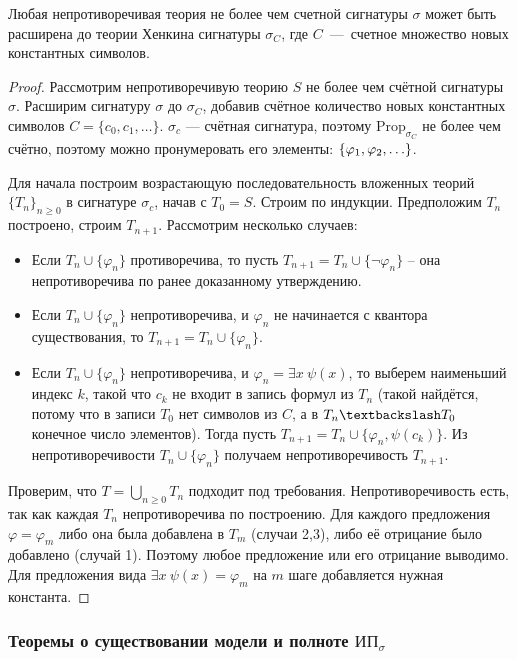 \begin{prop}
	Любая непротиворечивая теория не более чем счетной сигнатуры $\sigma$ может быть расширена до теории Хенкина сигнатуры $\sigma_C$, где  $C$~— счетное множество новых константных символов. 
\end{prop}
\begin{proof}
Рассмотрим непротиворечивую теорию $S$ не более чем счётной сигнатуры $\sigma$. Расширим сигнатуру $\sigma$ до $\sigma_C$, добавив счётное количество новых константных символов $C = \{c_0, c_1, \ldots\}$.
$\sigma_c$ — счётная сигнатура, поэтому $\text{Prop}_{\sigma_C}$ не более чем счётно, поэтому можно пронумеровать его элементы: $\set*{\vfi_1, \vfi_2, \dots}$.

Для начала построим возрастающую последовательность вложенных теорий $\{T_n\}_{n\ge 0}$ в сигнатуре $\sigma_c$, начав с $T_0 = S$. Строим по индукции. Предположим $T_n$ построено, строим $T_{n+1}$. Рассмотрим несколько случаев:
\begin{itemize}
    \item Если $T_n\cup\{\varphi_n\}$ противоречива, то пусть $T_{n+1} = T_n\cup\{\neg\varphi_n\}$ -- она непротиворечива по ранее доказанному утверждению.
    \item Если $T_n\cup\{\varphi_n\}$ непротиворечива, и $\varphi_n$ не начинается с квантора существования, то $T_{n+1} = T_n\cup\{\varphi_n\}$.
    \item Если $T_n\cup\{\varphi_n\}$ непротиворечива, и $\varphi_n = \exists x~\psi(x)$, то выберем наименьший индекс $k$, такой что $c_k$ не входит в запись формул из $T_n$ (такой найдётся, потому что в записи $T_0$ нет символов из $C$, а в $T_n\textbackslash T_0$ конечное число элементов). Тогда пусть $T_{n+1} = T_n \cup \{\varphi_n, \psi(c_k)\}$. Из непротиворечивости $T_n\cup\{\varphi_n\}$ получаем непротиворечивость $T_{n+1}$.
\end{itemize}

Проверим, что $T = \bigcup_{n\ge 0} T_n$ подходит под требования. Непротиворечивость есть, так как каждая $T_n$ непротиворечива по построению. Для каждого предложения $\varphi = \varphi_m$ либо она была добавлена в $T_m$ (случаи 2,3), либо её отрицание было добавлено (случай 1). Поэтому любое предложение или его отрицание выводимо. Для предложения вида $\exists x~\psi(x) = \varphi_m$ на $m$ шаге добавляется нужная константа.

\end{proof}

\subsubsection{Теоремы о существовании модели и полноте $\text{ИП}_\sigma$}

